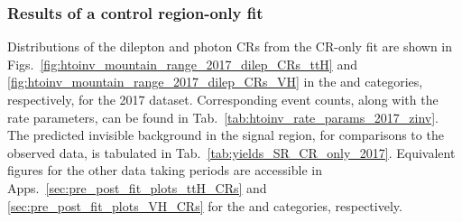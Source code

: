 



\subsubsection{Results of a control region-only fit}
\label{subsubsec:htoinv_zinv_CR_only_fit}

Distributions of the dilepton and photon \glspl{CR} from the \gls{CR}-only fit are shown in Figs.~\ref{fig:htoinv_mountain_range_2017_dilep_CRs_ttH} and \ref{fig:htoinv_mountain_range_2017_dilep_CRs_VH} in the \ttH and \VH categories, respectively, for the 2017 dataset. Corresponding event counts, along with the rate parameters, can be found in Tab.~\ref{tab:htoinv_rate_params_2017_zinv}. The predicted invisible \PZ background in the signal region, for comparisons to the observed data, is tabulated in Tab.~\ref{tab:yields_SR_CR_only_2017}. Equivalent figures for the other data taking periods are accessible in Apps.~\ref{sec:pre_post_fit_plots_ttH_CRs} and \ref{sec:pre_post_fit_plots_VH_CRs} for the \ttH and \VH categories, respectively.

